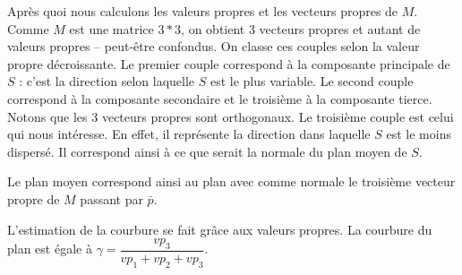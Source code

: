 ﻿\documentclass[12pt, twoside]{article}
\begin{document}
Après quoi nous calculons les valeurs propres et les vecteurs propres de $M$. Comme $M$ est une matrice $3*3$, on obtient 3 vecteurs propres et autant de valeurs propres -- peut-être confondus. On classe ces couples selon la valeur propre décroissante. Le premier couple correspond à la composante principale de $S$ : c'est la direction selon laquelle $S$ est le plus variable. Le second couple correspond à la composante secondaire et le troisième à la composante tierce. Notons que les 3 vecteurs propres sont orthogonaux. Le troisième couple est celui qui nous intéresse. En effet, il représente la direction dans laquelle $S$ est le moins dispersé. Il correspond ainsi à ce que serait la normale du plan moyen de $S$.

Le plan moyen correspond ainsi au plan avec comme normale le troisième vecteur propre de $M$ passant par $\bar{p}$.

L'estimation de la courbure se fait grâce aux valeurs propres. La courbure du plan est égale à $\gamma = \dfrac{vp_3}{vp_1 + vp_2 + vp_3}$.

\newpage


\end{document}
